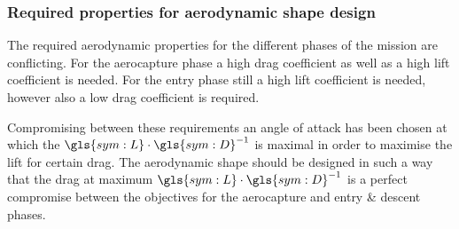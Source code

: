 \subsubsection{Required properties for aerodynamic shape design} \label{sec:trajectory_summary}
The required aerodynamic properties for the different phases of the mission are conflicting. For the aerocapture phase a high drag coefficient as well as a high lift coefficient is needed. For the entry phase still a high lift coefficient is needed, however also a low drag coefficient is required.

Compromising between these requirements an angle of attack has been chosen at which the $\gls{sym:L}\cdot\gls{sym:D}^{-1}$ is maximal in order to maximise the lift for certain drag. The aerodynamic shape should be designed in such a way that the drag at maximum $\gls{sym:L}\cdot\gls{sym:D}^{-1}$ is a perfect compromise between the objectives for the aerocapture and entry \& descent phases.
